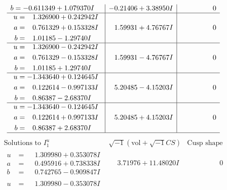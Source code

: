 \documentclass[1p]{elsarticle_modified}
\theoremstyle{definition}
\newcommand{\I}{\sqrt{-1}}
\begin{document}
$$\begin{array}{c|c|c}
\begin{aligned}
b &= -0.611349 + 1.079370 I\end{aligned}
 & -0.21406 + 3.38950 I & \phantom{-0.000000 } 0 \\ \hline\begin{aligned}
u &= \phantom{-}1.326900 + 0.242942 I \\
a &= \phantom{-}0.761329 + 0.153328 I \\
b &= \phantom{-}1.01185 - 1.29740 I\end{aligned}
 & \phantom{-}1.59931 + 4.76767 I & \phantom{-0.000000 } 0 \\ \hline\begin{aligned}
u &= \phantom{-}1.326900 - 0.242942 I \\
a &= \phantom{-}0.761329 - 0.153328 I \\
b &= \phantom{-}1.01185 + 1.29740 I\end{aligned}
 & \phantom{-}1.59931 - 4.76767 I & \phantom{-0.000000 } 0 \\ \hline\begin{aligned}
u &= -1.343640 + 0.124645 I \\
a &= \phantom{-}0.122614 - 0.997133 I \\
b &= \phantom{-}0.86387 - 2.68370 I\end{aligned}
 & \phantom{-}5.20485 - 4.15203 I & \phantom{-0.000000 } 0 \\ \hline\begin{aligned}
u &= -1.343640 - 0.124645 I \\
a &= \phantom{-}0.122614 + 0.997133 I \\
b &= \phantom{-}0.86387 + 2.68370 I\end{aligned}
 & \phantom{-}5.20485 + 4.15203 I & \phantom{-0.000000 } 0\\
 \hline 
 \end{array}$$\newpage$$\begin{array}{c|c|c}  
\text{Solutions to }I^u_{1}& \I (\text{vol} + \sqrt{-1}CS) & \text{Cusp shape}\\
 \hline 
\begin{aligned}
u &= \phantom{-}1.309980 + 0.353078 I \\
a &= \phantom{-}0.495916 + 0.738338 I \\
b &= \phantom{-}0.742765 - 0.909847 I\end{aligned}
 & \phantom{-}3.71976 + 11.48020 I & \phantom{-0.000000 } 0 \\ \hline\begin{aligned}
u &= \phantom{-}1.309980 - 0.353078 I \\

\end{aligned}
\end{array}$$
\end{document}
